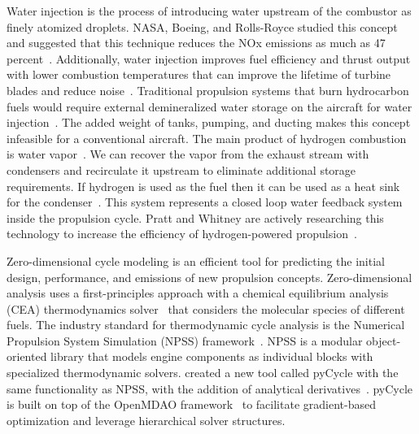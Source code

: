 \documentclass[conf]{new-aiaa}
\begin{document}
Water injection is the process of introducing water upstream of the combustor as finely atomized droplets.
NASA, Boeing, and Rolls-Royce studied this concept and suggested that this technique reduces the NOx emissions as much as 47 percent~\cite{Daggett2010}.
Additionally, water injection improves fuel efficiency and thrust output with lower combustion temperatures that can improve the lifetime of turbine blades and reduce noise~\cite{Daggett2010}.
Traditional propulsion systems that burn hydrocarbon fuels would require external demineralized water storage on the aircraft for water injection~\cite{Mourouzidis2015}.
The added weight of tanks, pumping, and ducting makes this concept infeasible for a conventional aircraft.
The main product of hydrogen combustion is water vapor~\cite{Strom2002}.
We can recover the vapor from the exhaust stream with condensers and recirculate it upstream to eliminate additional storage requirements.
If hydrogen is used as the fuel then it can be used as a heat sink for the condenser~\cite{Boggia2002}.
This system represents a closed loop water feedback system inside the propulsion cycle.
Pratt and Whitney are actively researching this technology to increase the efficiency of hydrogen-powered propulsion~\cite{arpa-e_2021}.

Zero-dimensional cycle modeling is an efficient tool for predicting the initial design, performance, and emissions of new propulsion concepts.
Zero-dimensional analysis uses a first-principles approach with a chemical equilibrium analysis (CEA) thermodynamics solver~\cite{Gordon1994} that considers the molecular species of different fuels.
The industry standard for thermodynamic cycle analysis is the Numerical Propulsion System Simulation (NPSS) framework~\cite{JonesNPSS}.
NPSS is a modular object-oriented library that models engine components as individual blocks with specialized thermodynamic solvers.
\citet{Hendricks2019} created a new tool called pyCycle with the same functionality as NPSS, with the addition of analytical derivatives~\cite{Gray2017b}.
pyCycle is built on top of the OpenMDAO framework~\cite{Gray2019a} to facilitate gradient-based optimization and leverage hierarchical solver structures.
\end{document}
